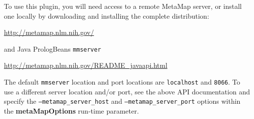 To use this plugin, you will need access to a remote MetaMap server, or install one locally by downloading and installing the complete distribution:

\url{http://metamap.nlm.nih.gov/}

and Java PrologBeans \texttt{mmserver}

\url{http://metamap.nlm.nih.gov/README_javaapi.html}

The default \texttt{mmserver} location and port locations are \texttt{localhost} and \texttt{8066}. To use a different server location and/or port, see the above API documentation and specify the \texttt{--metamap\_server\_host} and \texttt{--metamap\_server\_port} options within the \textbf{metaMapOptions} run-time parameter.


